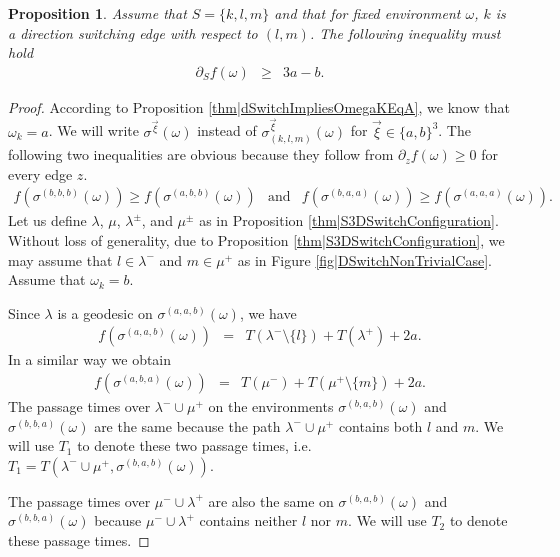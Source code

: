 \documentclass[reqno]{amsart}
\newtheorem{proposition}[theorem]{Proposition}
\begin{document}
\begin{proposition}\label{thm|lowerBoundS3DSwitch} 
Assume that $S=\{k,l,m\}$ and that for fixed environment $\omega$, $k$ is a direction switching edge with respect to 
$(l,m)$.
The following inequality must hold
\begin{eqnarray} 
\partial_Sf(\omega)&\geq&3a-b.\label{eqn|BoundS3DirectionSwitch}
\end{eqnarray}
\end{proposition}
\begin{proof} According to Proposition \ref{thm|dSwitchImpliesOmegaKEqA}, we know that $\omega_k=a$. 
We will write $\sigma^{\overrightarrow{\xi}}(\omega)$ instead of 
$\sigma^{\overrightarrow{\xi}}_{(k,l,m)}(\omega)$ for $\overrightarrow{\xi}\in\{a,b\}^3$. 
The following two inequalities are obvious because they follow from $\partial_zf(\omega)\geq 0$ for every edge $z$.
\begin{eqnarray}
f(\sigma^{(b,b,b)} (\omega))\geq f(\sigma^{(a,b,b)} (\omega)) &\mbox{and}& 
f(\sigma^{(b,a,a)} (\omega))\geq f(\sigma^{(a,a,a)} (\omega)). 
\label{eqn|LBS3DSwitchObv0102}
\end{eqnarray}
Let us define $\lambda$, $\mu$, $\lambda^{\pm}$, and $\mu^{\pm}$ as in Proposition \ref{thm|S3DSwitchConfiguration}. Without loss of generality, due to Proposition \ref{thm|S3DSwitchConfiguration}, we may assume that $l\in \lambda^-$ and $m\in \mu^+$ as in Figure \ref{fig|DSwitchNonTrivialCase}. Assume that $\omega_k=b$. 


Since $\lambda$ is a geodesic on $\sigma^{(a,a,b)}(\omega)$, we have 
\begin{eqnarray}
f(\sigma^{(a,a,b)}(\omega))&=& T(\lambda^-\setminus\{l\})+T(\lambda^+)+2a.
\label{eqn|LBS3DSwitchL}
\end{eqnarray}
In a similar way we obtain 
\begin{eqnarray}
f(\sigma^{(a,b,a)}(\omega))&=&T(\mu^-)+ T(\mu^+\setminus\{m\})+2a.
\label{eqn|LBS3DSwitchM}
\end{eqnarray}
The passage times over $\lambda^-\cup \mu^+$ on the environments $\sigma^{(b,a,b)}(\omega)$ and $\sigma^{(b,b,a)}(\omega)$ are the same because the path $\lambda^-\cup \mu^+$ contains both $l$ and $m$. We will use $T_1$ to denote these two passage times, i.e. $T_1=T(\lambda^-\cup\mu^+,\sigma^{(b,a,b)}(\omega))$. 

The passage times over $\mu^-\cup \lambda^+$ are also the same on $\sigma^{(b,a,b)}(\omega)$ and $\sigma^{(b,b,a)}(\omega)$  because $\mu^-\cup \lambda^+$ contains neither $l$ nor $m$. We will use $T_2$ to denote these passage times.


\end{proof}
\end{document}
